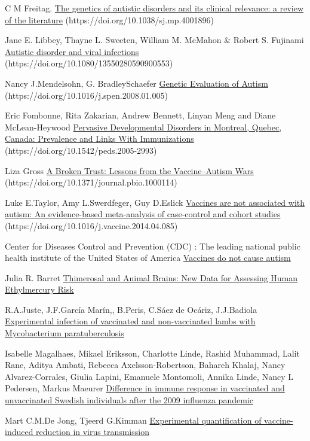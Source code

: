 \documentclass[10pt]{article}
\begin{document}
\begin{thebibliography}{9}

C M Freitag.
\href{https://doi.org/10.1038/sj.mp.4001896}{The genetics of autistic disorders and its clinical relevance: a review of the literature} (https://doi.org/10.1038/sj.mp.4001896)

Jane E. Libbey, Thayne L. Sweeten, William M. McMahon \& Robert S. Fujinami
\href{https://doi.org/10.1080/13550280590900553}{Autistic disorder and viral infections} (https://doi.org/10.1080/13550280590900553)

Nancy J.Mendelsohn, G. BradleySchaefer
\href{https://doi.org/10.1016/j.spen.2008.01.005}{Genetic Evaluation of Autism} (https://doi.org/10.1016/j.spen.2008.01.005)

Eric Fombonne, Rita Zakarian, Andrew Bennett, Linyan Meng and Diane McLean-Heywood
\href{https://doi.org/10.1542/peds.2005-2993}{Pervasive Developmental Disorders in Montreal, Quebec, Canada: Prevalence and Links With Immunizations} (https://doi.org/10.1542/peds.2005-2993)

Liza Gross
\href{https://doi.org/10.1371/journal.pbio.1000114}{A Broken Trust: Lessons from the Vaccine–Autism Wars} (https://doi.org/10.1371/journal.pbio.1000114)

Luke E.Taylor, Amy L.Swerdfeger, Guy D.Eslick
\href{https://doi.org/10.1016/j.vaccine.2014.04.085}{Vaccines are not associated with autism: An evidence-based meta-analysis of case-control and cohort studies} (https://doi.org/10.1016/j.vaccine.2014.04.085)

Center for Diseases Control and Prevention (CDC) : The leading national public health institute of the United States of America
\href{https://www.cdc.gov/vaccinesafety/concerns/autism.html}{Vaccines do not cause autism}

Julia R. Barret
\href{https://www.ncbi.nlm.nih.gov/pmc/articles/PMC1280369/}{Thimerosal and Animal Brains: New Data for Assessing Human Ethylmercury Risk}

R.A.Juste, J.F.García Marín,, B.Peris, C.Sáez de Ocáriz, J.J.Badiola
\href{https://doi.org/10.1016/S0021-9975(08)80189-2}{Experimental infection of vaccinated and non-vaccinated lambs with Mycobacterium paratuberculosis}

Isabelle Magalhaes, Mikael Eriksson, Charlotte Linde, Rashid Muhammad, Lalit Rane, Aditya Ambati, Rebecca Axelsson-Robertson, Bahareh Khalaj, Nancy Alvarez-Corrales, Giulia Lapini, Emanuele Montomoli, Annika Linde, Nancy L Pedersen, Markus Maeurer
\href{https://doi.org/10.1186/1471-2334-14-319}{Difference in immune response in vaccinated and unvaccinated Swedish individuals after the 2009 influenza pandemic}

Mart C.M.De Jong, Tjeerd G.Kimman
\href{https://doi.org/10.1016/0264-410X(94)90229-1}{Experimental quantification of vaccine-induced reduction in virus transmission}
\end{thebibliography}
\end{document}
